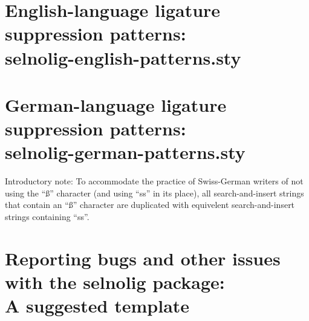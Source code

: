 \documentclass[12pt]{article}
\newcommand{\pkg}[1]{\textsf{#1}}
\begin{document}

\clearpage
{}

\section[English-language ligature suppression patterns: selnolig-english-patterns.sty]{English-language ligature suppression patterns: \\ 
\pkg{selnolig-english-patterns.sty}}
\label{sec:eng-listing}

\begin{multicols}{2}
\end{multicols}

\clearpage
\section[German-language ligature suppression patterns:
selnolig-german-patterns.sty]{German-language ligature suppression patterns: \\ 
\pkg{selnolig-german-patterns.sty}}
\label{sec:germ-listing}


Introductory note: To accommodate the practice of Swiss-German writers of not using the \enquote{ß} character (and using \enquote{ss} in its place), all search-and-insert strings that contain an \enquote{ß} character are duplicated with equivelent search-and-insert strings containing \enquote{ss}.

\bigskip

\begin{multicols}{2}
\end{multicols}

\clearpage
\section[Reporting bugs and other issues with the selnolig package: A suggested template]{Reporting bugs and other issues with the \pkg{selnolig} package:\\A suggested template} \label{sec:template}

\end{document}
